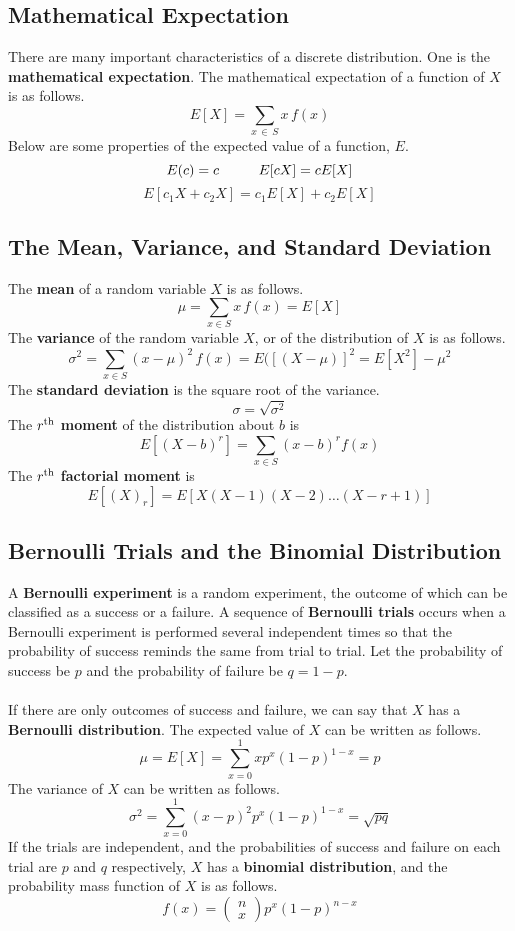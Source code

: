 \documentclass{article}
\begin{document}
\subsection{Mathematical Expectation}
There are many important characteristics of a discrete distribution. One is the \textbf{mathematical expectation}. The mathematical expectation of a function of \(X\) is as follows.
\[E[X]=\sum\limits_{x\,\in\,S}x\,f(x)\]
Below are some properties of the expected value of a function, \(E\).
\[E(c)=c\hspace{10 mm}E[cX]=cE[X]\]
\[E[c_1X+c_2X]=c_1E[X]+c_2E[X]\]
\subsection{The Mean, Variance, and Standard Deviation}
The \textbf{mean} of a random variable \(X\) is as follows.
\[\mu=\sum\limits_{x\in S}x\,f(x)=E[X]\]
The \textbf{variance} of the random variable \(X\), or of the distribution of \(X\) is as follows.
\[\sigma^2=\sum\limits_{x\in S}(x-\mu)^2\,f(x)=E([(X-\mu)]^2=E[X^2]-\mu^2\]
The \textbf{standard deviation} is the square root of the variance.
\[\sigma=\sqrt{\sigma^2}\]
The \(r^\textnormal{th}\) \textbf{moment} of the distribution about \(b\) is
\[E[(X-b)^r]=\sum\limits_{x\in S}(x-b)^rf(x)\]
The \(r^\textnormal{th}\) \textbf{factorial moment} is
\[E[(X)_r]=E[X(X-1)(X-2)\hdots (X-r+1)]\]
\subsection{Bernoulli Trials and the Binomial Distribution}
A \textbf{Bernoulli experiment} is a random experiment, the outcome of which can be classified as a success or a failure. A sequence of \textbf{Bernoulli trials} occurs when a Bernoulli experiment is performed several independent times so that the probability of success reminds the same from trial to trial. Let the probability of success be \(p\) and the probability of failure be \(q=1-p\).\\\\
If there are only outcomes of success and failure, we can say that \(X\) has a \textbf{Bernoulli distribution}. The expected value of \(X\) can be written as follows.
\[\mu=E[X]=\sum\limits_{x=0}^1xp^x(1-p)^{1-x}=p\]
The variance of \(X\) can be written as follows.
\[\sigma^2=\sum\limits_{x=0}^1(x-p)^2p^x(1-p)^{1-x}=\sqrt{pq}\]
If the trials are independent, and the probabilities of success and failure on each trial are \(p\) and \(q\) respectively, \(X\) has a \textbf{binomial distribution}, and the probability mass function of \(X\) is as follows.
\[f(x)=\left(\begin{matrix}n\\x\end{matrix}\right)p^x(1-p)^{n-x}\]
\end{document}
